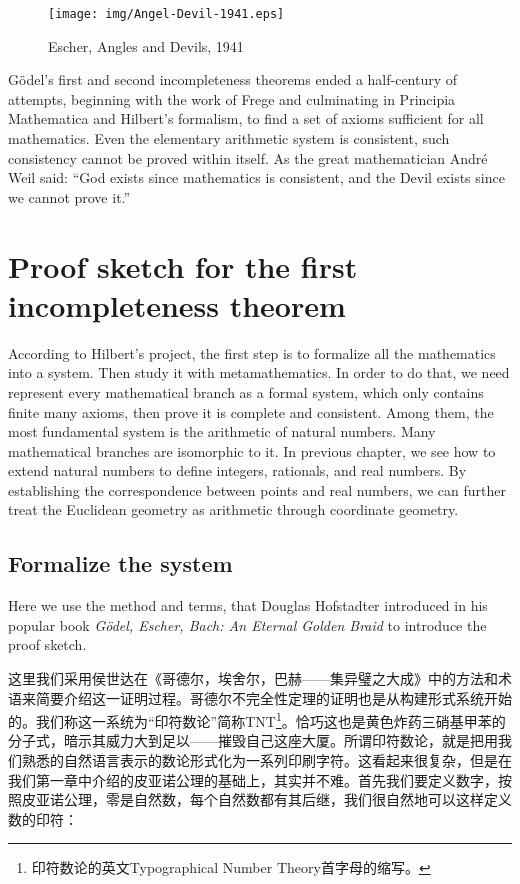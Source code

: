\documentclass{article}
\begin{document}
\begin{figure}[htbp]
 \centering
 \texttt{[image: img/Angel-Devil-1941.eps]}
 \caption{Escher, Angles and Devils, 1941}
 \label{fig:Angel-Devil-1941}
\end{figure}

Gödel's first and second incompleteness theorems ended a half-century of attempts, beginning with the work of Frege and culminating in Principia Mathematica and Hilbert's formalism, to find a set of axioms sufficient for all mathematics. Even the elementary arithmetic system is consistent, such consistency cannot be proved within itself. As the great mathematician André Weil said: ``God exists since mathematics is consistent, and the Devil exists since we cannot prove it.''\cite{HanXueTao16}

\section{Proof sketch for the first incompleteness theorem}

According to Hilbert's project, the first step is to formalize all the mathematics into a system. Then study it with metamathematics. In order to do that, we need represent every mathematical branch as a formal system, which only contains finite many axioms, then prove it is complete and consistent. Among them, the most fundamental system is the arithmetic of natural numbers. Many mathematical branches are isomorphic to it. In previous chapter, we see how to extend natural numbers to define integers, rationals, and real numbers. By establishing the correspondence between points and real numbers, we can further treat the Euclidean geometry as arithmetic through coordinate geometry.

\subsection{Formalize the system}
 
Here we use the method and terms, that Douglas Hofstadter introduced in his popular book {\em Gödel, Escher, Bach: An Eternal Golden Braid} to introduce the proof sketch.

这里我们采用侯世达在《哥德尔，埃舍尔，巴赫——集异璧之大成》中的方法和术语来简要介绍这一证明过程。哥德尔不完全性定理的证明也是从构建形式系统开始的。我们称这一系统为“印符数论”简称TNT\footnote{印符数论的英文Typographical Number Theory首字母的缩写。}。恰巧这也是黄色炸药三硝基甲苯的分子式，暗示其威力大到足以——摧毁自己这座大厦。所谓印符数论，就是把用我们熟悉的自然语言表示的数论形式化为一系列印刷字符。这看起来很复杂，但是在我们第一章中介绍的皮亚诺公理的基础上，其实并不难。首先我们要定义数字，按照皮亚诺公理，零是自然数，每个自然数都有其后继，我们很自然地可以这样定义数的印符：
\end{document}
